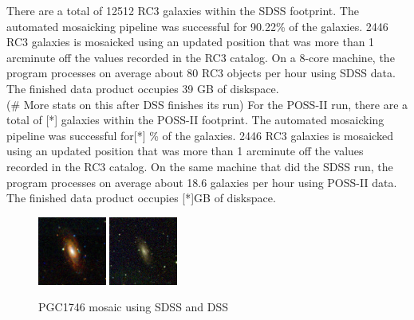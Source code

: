 \documentclass[5p]{elsarticle}
\begin{document}
\indent There are a total of 12512 RC3 galaxies within the SDSS footprint. The automated mosaicking pipeline was  successful for 90.22\% of the galaxies. 2446 RC3 galaxies is mosaicked using an updated position that was more than 1 arcminute off the values recorded in the RC3 catalog.  On a 8-core machine, the program processes on average about 80 RC3 objects per hour using SDSS data.  The finished data product occupies 39 GB of diskspace. 
\\
\indent  (\# More stats on this after DSS finishes its run) 
 For the POSS-II run, there are a total of [*] galaxies within the POSS-II footprint.
 The automated mosaicking pipeline was  successful for[*] \% of the galaxies. 2446 RC3 galaxies is mosaicked using an updated position that was more than 1 arcminute off the values recorded in the RC3 catalog. On the same machine that did the SDSS run, the program processes on average about 18.6 galaxies per hour using POSS-II data.  The finished data product occupies [*]GB of diskspace. 
\begin{figure}[h]
 \centering
	\includegraphics[width=0.2\textwidth]{figures/SDSS_1154_BEST}
	\includegraphics[width=0.2\textwidth]{figures/DSS_1154_BEST}	
	\caption{PGC1746 mosaic using SDSS and DSS}
	\label{sdss_dss_comp}
\end{figure}
\end{document}
